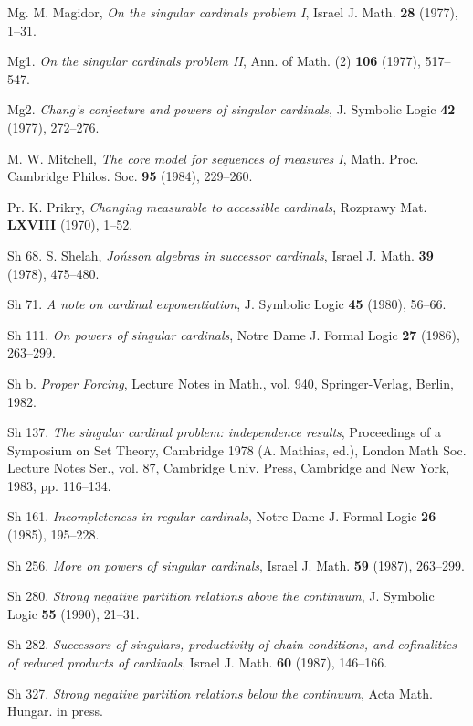 \REF Mg. M. Magidor, {\it On the singular cardinals problem
\RM I\/}, Israel J. Math. {\bf 28} (1977), 1--31.
 
\REF Mg1. {\Bysame}  {\it On the singular cardinals problem
\rm II\/}, Ann. of Math. (2) {\bf 106} (1977), 517--547.
 
\REF Mg2. {\Bysame} {\it Chang's conjecture and powers of 
singular
cardinals\/}, J. Symbolic Logic {\bf 42} (1977), 272--276.
 
\REF M. W. Mitchell, {\it The core model for sequences of 
measures \rm I\/},
Math. Proc. Cambridge Philos. Soc. {\bf 95} (1984), 
229--260.
 
\REF Pr. K. Prikry, {\it Changing measurable to accessible 
cardinals\/},
Rozprawy Mat. {\bf LXVIII} (1970), 1--52.
 
\REF Sh 68. S. Shelah, {\it Jo\'nsson algebras in successor
cardinals\/}, Israel J. Math. {\bf 39} (1978), 475--480.
 
\REF Sh 71. {\Bysame} {\it A note on cardinal 
exponentiation\/}, J. Symbolic
Logic {\bf 45} (1980), 56--66.
 
\REF Sh 111. {\Bysame} {\it On powers of singular 
cardinals\/}, Notre Dame
J. Formal Logic {\bf 27} (1986), 263--299.
 
\REF Sh b. {\Bysame} {\it Proper Forcing\/}, Lecture
Notes in Math., vol. 940, Springer-Verlag,
Berlin, 1982.
 
\REF Sh 137. {\Bysame} {\it The singular cardinal problem: 
independence
results\/}, Proceedings of a Symposium on Set Theory,
Cambridge
1978 (A. Mathias, ed.), London Math Soc. Lecture Notes 
Ser., vol. 87,
Cambridge Univ. Press, 
Cambridge and New York, 1983, pp. 116--134.
 
\REF Sh 161. {\Bysame} {\it Incompleteness in regular 
cardinals\/},
Notre Dame J. Formal Logic {\bf 26} (1985), 195--228.
 
\REF Sh 256. {\Bysame} {\it More on powers of singular 
cardinals\/}, Israel
J. Math. {\bf 59} (1987), 263--299.
 
\REF Sh 280. {\Bysame} {\it Strong negative partition 
relations above the
continuum\/}, J. Symbolic Logic {\bf 55} (1990), 21--31.
 
\REF Sh 282. {\Bysame} {\it Successors of singulars, 
productivity of
chain conditions, and cofinalities of reduced products of 
cardinals\/},
Israel J. Math. {\bf 60} (1987), 146--166.
 
\REF Sh 327. {\Bysame} {\it Strong negative partition 
relations below the
continuum\/}, Acta Math. Hungar. in press.
 
